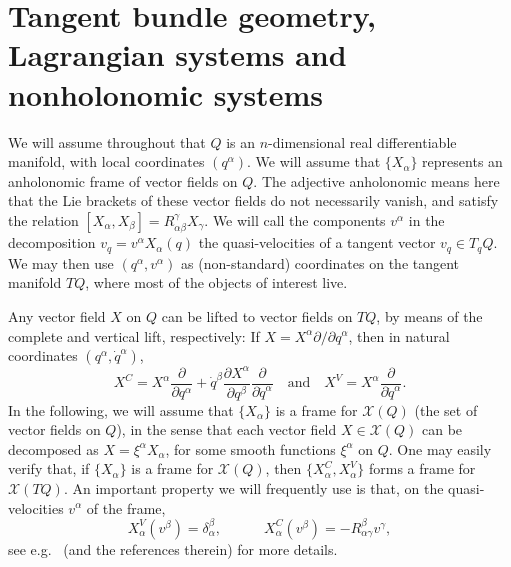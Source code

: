 \documentclass[11pt]{article}
\begin{document}
\section{Tangent bundle geometry,  Lagrangian systems and nonholonomic systems} \label{sec2}


 


We will assume throughout  that $Q$ is an $n$-dimensional real differentiable  manifold, with local coordinates $(q^\alpha)$. We will assume that $\{X_\alpha\}$ represents an  anholonomic frame of vector fields  on $Q$. The adjective anholonomic means here that the Lie brackets of these vector fields do not necessarily vanish, and satisfy the relation $[X_\alpha,X_\beta] = R^\gamma_{\alpha\beta}X_\gamma$. We will call the components $v^\alpha$ in the decomposition $v_q = v^\alpha X_\alpha (q)$ the quasi-velocities of a tangent vector $v_q\in T_qQ$. We may then use $(q^\alpha,v^\alpha)$ as (non-standard) coordinates on the tangent manifold $TQ$, where most of the objects of interest live. 



Any vector field $X$ on $Q$ can be lifted to vector fields on $TQ$, by means of the complete and vertical lift, respectively: If  $X=X^\alpha\partial/\partial{q^\alpha}$, then in natural coordinates $(q^\alpha, {\dot q}^\alpha)$,
$$
 X^C=X^\alpha \frac{\partial}{\partial q^\alpha}+\dot{q}^\beta \frac{\partial X^\alpha}{\partial q^\beta}\frac{\partial}{\partial \dot{q}^\alpha} \quad\text{and}\quad X^V=X^\alpha \frac{\partial}{\partial \dot{q}^\alpha}.
$$ 
{In the following, we will assume that $\{X_\alpha\}$ is a frame for $\mathcal{X}(Q)$ (the set of vector fields on $Q$), in the sense that each vector field $X\in\mathcal{X}(Q)$ can be decomposed as $X=\xi^\alpha X_\alpha$, for some smooth functions $\xi^\alpha$ on $Q$.} One may easily verify that, if $\{X_\alpha\}$ is a {frame} for $\mathcal{X}(Q)$, then $\{X_\alpha^C,X_\alpha^V\}$ forms a   {frame} for $\mathcal{X}(TQ)$. An important property we will frequently use is that, on the quasi-velocities $v^\alpha$ of the frame,
$$
X_\alpha^V(v^\beta)=\delta_\alpha^\beta,\quad\quad\quad X_\alpha^C(v^\beta)=-R_{\alpha\gamma}^\beta v^\gamma,
$$
see e.g.\ \cite{anhol} (and the references therein)  for more details.
\end{document}
